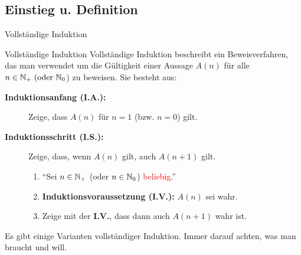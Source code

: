 \subsection{Einstieg u. Definition}
\begin{frame}{Vollständige Induktion}
	\begin{block}{Vollständige Induktion}
		Vollständige Induktion beschreibt ein Beweisverfahren, das man verwendet um die Gültigkeit einer Aussage \(A(n)\) für alle \(n \in \mathbb{N}_+ \text{ (oder } \mathbb{N}_{0}\)) zu beweisen. Sie besteht aus: \\[.5em]
		\begin{description}
			\item [\textbf{Induktionsanfang (I.A.):}] Zeige, dass \(A(n)\) für \(n=1\) (bzw. \(n=0\)) gilt.
			\item [\textbf{Induktionsschritt (I.S.):}] Zeige, dass, wenn \(A(n)\) gilt, auch \(A(n+1)\) gilt.
				\begin{enumerate}
					\item \enquote{Sei $n \in \mathbb{N}_+$ (oder $n \in \mathbb{N}_0$) \textcolor{red}{beliebig}.}
					\item \textbf{Induktionsvoraussetzung (I.V.):} $A(n)$ sei wahr.
					\item Zeige mit der \textbf{I.V.}, dass dann auch $A(n+1)$ wahr ist.
				\end{enumerate}
		\end{description}
	\end{block}

	\begin{alertblock}{}
		Es gibt einige Varianten vollständiger Induktion. Immer darauf achten, was man braucht und will. %
	\end{alertblock}
\end{frame}
